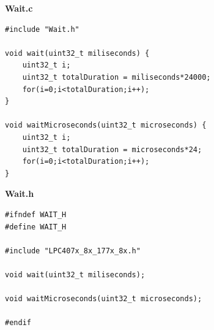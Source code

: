 \documentclass{article}
\begin{document}
\linebreak
\textbf{Wait.c}
\begin{lstlisting}
#include "Wait.h"

void wait(uint32_t miliseconds) {
	uint32_t i;
	uint32_t totalDuration = miliseconds*24000;
	for(i=0;i<totalDuration;i++);
}

void waitMicroseconds(uint32_t microseconds) {
	uint32_t i;
	uint32_t totalDuration = microseconds*24;
	for(i=0;i<totalDuration;i++);
}
\end{lstlisting}
\linebreak
\textbf{Wait.h}
\begin{lstlisting}
#ifndef WAIT_H
#define WAIT_H

#include "LPC407x_8x_177x_8x.h"

void wait(uint32_t miliseconds);

void waitMicroseconds(uint32_t microseconds);

#endif
\end{lstlisting}
\end{document}
